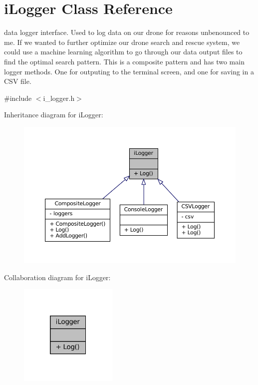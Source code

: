 \hypertarget{classiLogger}{}\section{i\+Logger Class Reference}
\label{classiLogger}


data logger interface. Used to log data on our drone for reasons unbenounced to me. If we wanted to further optimize our drone search and rescue system, we could use a machine learning algorithm to go through our data output files to find the optimal search pattern. This is a composite pattern and has two main logger methods. One for outputing to the terminal screen, and one for saving in a C\+SV file.  




{\ttfamily \#include $<$i\+\_\+logger.\+h$>$}



Inheritance diagram for i\+Logger\+:\nopagebreak
\begin{figure}[H]
\begin{center}
\leavevmode
\includegraphics[width=350pt]{classiLogger__inherit__graph}
\end{center}
\end{figure}


Collaboration diagram for i\+Logger\+:\nopagebreak
\begin{figure}[H]
\begin{center}
\leavevmode
\includegraphics[width=133pt]{classiLogger__coll__graph}
\end{center}
\end{figure}
